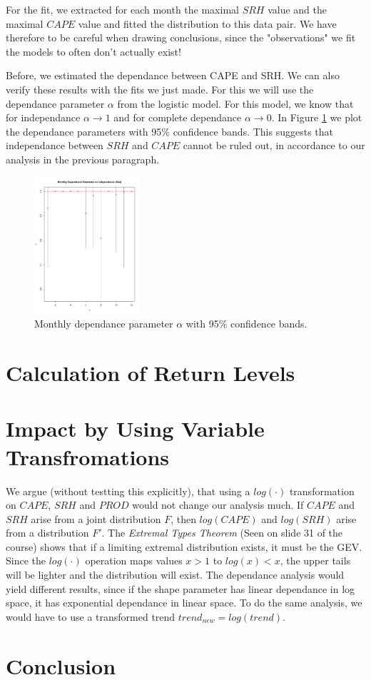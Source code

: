 \documentclass[10pt,conference,compsocconf]{IEEEtran}
\begin{document}
For the fit, we extracted for each month the maximal $SRH$ value and the maximal $CAPE$ value and fitted the distribution to this data pair. We have therefore to be careful when drawing conclusions, since the "observations" we fit the models to often don't actually exist!

Before, we estimated the dependance between CAPE and SRH. We can also verify these results with the fits we just made. For this we will use the dependance parameter $\alpha$ from the logistic model. For this model, we know that for independance $\alpha \to 1$ and for complete dependance $\alpha \to 0$. In Figure \ref{fig:cape_srh_dependance_logistic} we plot the dependance parameters with 95\% confidence bands. This suggests that independance between $SRH$ and $CAPE$ cannot be ruled out, in accordance to our analysis in the previous paragraph.

\begin{figure}
	\centering
	\includegraphics[width=0.35\textwidth]{../plots/dependance_parameter_cape_srh_logistic.pdf}
	\caption{Monthly dependance parameter $\alpha$ with 95\% confidence bands.}
	\label{fig:cape_srh_dependance_logistic}
\end{figure}

\section*{Calculation of Return Levels}

\section*{Impact by Using Variable Transfromations}
We argue (without testting this explicitly), that using a $log(\cdot)$ transformation on $CAPE$, $SRH$ and $PROD$ would not change our analysis much. If $CAPE$ and $SRH$ arise from a joint distribution $F$, then $log(CAPE)$ and $log(SRH)$ arise from a distribution $F'$. The \textit{Extremal Types Theorem} (Seen on slide 31 of the course) shows that if a limiting extremal distribution exists, it must be the GEV. Since the $log(\cdot)$ operation maps values $x>1$ to $log(x)<x$, the upper tails will be lighter and the distribution will exist. The dependance analysis would yield different results, since if the shape parameter has linear dependance in log space, it has exponential dependance in linear space. To do the same analysis, we would have to use a transformed trend $trend_{new}= log(trend)$. 

\section*{Conclusion}







	
\end{document}
